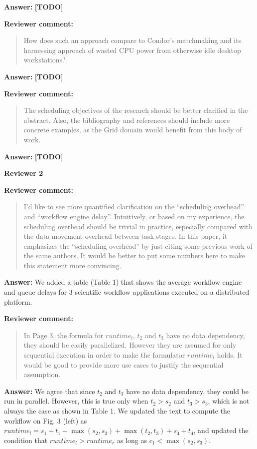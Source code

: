 \documentclass{letter}
\newenvironment{review}%
{\textbf{Reviewer comment:}\begin{quote}}%
{\end{quote}}%
\newcommand{\todo}[1]{%
      \color{red}\textbf{[TODO]} #1\color{black}}
\newcommand{\answer}[1]{%
      \textbf{Answer:} #1}
\begin{document}
\begin{letter}{}
\answer{\todo{}}



\begin{review}
How does such an approach compare to Condor's matchmaking and its harnessing approach of wasted CPU power from otherwise idle desktop workstations?
\end{review}

\answer{\todo{}}



\begin{review}
The scheduling objectives of the research should be better clarified in the abstract. Also, the bibliography and references should include more concrete examples, as the Grid domain would benefit from this body of work. 
\end{review}

\answer{\todo{}}



\newpage

%
%
\textbf{Reviewer 2}

\begin{review}
I'd like to see more quantified clarification on the ``scheduling overhead'' and ``workflow engine delay''. Intuitively, or based on my experience, the scheduling overhead should be trivial in practice, especially compared with the data movement overhead between task stages. In this paper, it emphasizes the ``scheduling overhead'' by just citing some previous work of the same authors. It would be better to put some numbers here to make this statement more convincing. 
\end{review}

\answer{We added a table (Table 1) that shows the average workflow engine and queue delays for 3 scientific workflow applications executed on a distributed platform.}



\begin{review}
In Page 3, the formula for $runtime_l$, $t_2$ and $t_3$ have no data dependency, they should be easily parallelized. However they are assumed for only sequential execution in order to make the formulator $runtime_l$ holds. It would be good to provide more use cases to justify the sequential assumption.
\end{review}

\answer{We agree that since $t_2$ and $t_3$ have no data dependency, they could be run in parallel. However, this is true only when $t_2 > s_2$ and $t_3 > s_3$, which is not always the case as shown in Table 1. We updated the text to compute the workflow on Fig. 3 (left) as $runtime_l= s_1+t_1+\max(s_2,s_3)+\max(t_2,t_3)+s_4+t_4$, and updated the condition that $runtime_l > runtime_r$ as long as $c_1 < \max(s_2,s_3)$.}





\end{letter}
\end{document}
